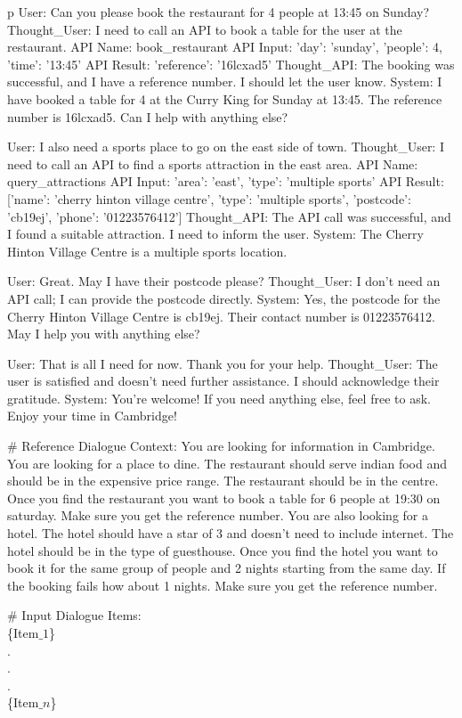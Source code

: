 \begin{table*}
\begin{tabular}{p\linewidth}
User: Can you please book the restaurant for 4 people at 13:45 on Sunday?  
Thought\_User: I need to call an API to book a table for the user at the restaurant.  
API Name: book\_restaurant  
API Input: {'day': 'sunday', 'people': 4, 'time': '13:45'}  
API Result: {'reference': '16lcxad5'}  
Thought\_API: The booking was successful, and I have a reference number. I should let the user know.  
System: I have booked a table for 4 at the Curry King for Sunday at 13:45. The reference number is 16lcxad5. Can I help with anything else?

User: I also need a sports place to go on the east side of town.  
Thought\_User: I need to call an API to find a sports attraction in the east area.  
API Name: query\_attractions  
API Input: {'area': 'east', 'type': 'multiple sports'}  
API Result: [{'name': 'cherry hinton village centre', 'type': 'multiple sports', 'postcode': 'cb19ej', 'phone': '01223576412'}]  
Thought\_API: The API call was successful, and I found a suitable attraction. I need to inform the user.  
System: The Cherry Hinton Village Centre is a multiple sports location. 

User: Great. May I have their postcode please?  
Thought\_User: I don't need an API call; I can provide the postcode directly.  
System: Yes, the postcode for the Cherry Hinton Village Centre is cb19ej. Their contact number is 01223576412. May I help you with anything else?

User: That is all I need for now. Thank you for your help.  
Thought\_User: The user is satisfied and doesn't need further assistance. I should acknowledge their gratitude.  
System: You're welcome! If you need anything else, feel free to ask. Enjoy your time in Cambridge!

# Reference Dialogue Context:
You are looking for information in Cambridge.
You are looking for a place to dine. The restaurant should serve indian food and should be in the expensive price range.
The restaurant should be in the centre.
Once you find the restaurant you want to book a table for 6 people at 19:30 on saturday.
Make sure you get the reference number.
You are also looking for a hotel. The hotel should have a star of 3 and doesn't need to include internet.
The hotel should be in the type of guesthouse.
Once you find the hotel you want to book it for the same group of people and 2 nights starting from the same day.
If the booking fails how about 1 nights.
Make sure you get the reference number.

\# Input Dialogue Items: \\
\{Item$\_1$\}\\
.\\
.\\
.\\
\{Item$\_n$\}\\
\bottomrule
\end{tabular}
\end{table*}